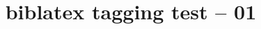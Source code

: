 \documentclass{article}
\title{biblatex tagging test -- 01}
\begin{document}
\cite{knuth:ct}

\cite{companion}

\printbibliography
\end{document}
